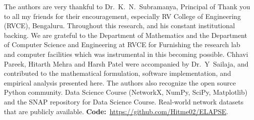 \documentclass[conference]{IEEEtran}
\begin{document}
The authors are very thankful to Dr.~K.~N.~Subramanya, Principal of
Thank you to all my friends for their encouragement, especially RV College of Engineering (RVCE), Bengaluru.
Throughout this research, and his constant institutional backing.
We are grateful to the Department of Mathematics and the
Department of Computer Science and Engineering at RVCE for
Furnishing the research lab and computer facilities
which was instrumental in this becoming possible.
Chhavi Pareek, Hitarth Mehra and Harsh Patel were accompanied by Dr.~Y~Sailaja, and
contributed to the mathematical formulation, software implementation,
and empirical analysis presented here.
The authors also recognize the open source Python community.
Data Science Course (NetworkX, NumPy, SciPy, Matplotlib) and the SNAP repository for Data Science Course.
Real-world network datasets that are publicly available.
\textbf{Code:}~\url{https://github.com/Hitme02/ELAPSE}.
\end{document}
